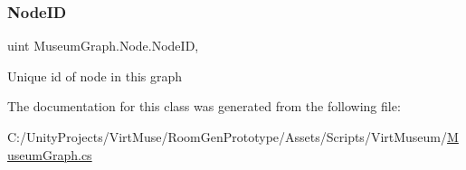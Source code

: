 \subsubsection{\texorpdfstring{Node\+ID}{NodeID}}
{\footnotesize\ttfamily uint Museum\+Graph.\+Node.\+Node\+ID\hspace{0.3cm}{\ttfamily [get]}, {}}



Unique id of node in this graph 



The documentation for this class was generated from the following file\+:\begin{DoxyCompactItemize}
\item 
C\+:/\+Unity\+Projects/\+Virt\+Muse/\+Room\+Gen\+Prototype/\+Assets/\+Scripts/\+Virt\+Museum/\mbox{\hyperlink{_museum_graph_8cs}{Museum\+Graph.\+cs}}\end{DoxyCompactItemize}
